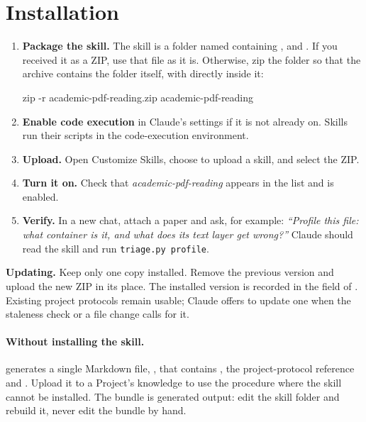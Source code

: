 \documentclass[11pt,a4paper]{article}
\newcommand\step[1]{\textsf{\textbf{#1}}}
\begin{document}
\section{Installation}\label{sec:install}

\begin{enumerate}
\item \step{Package the skill.} The skill is a folder named 
  containing ,  and . If you received it as a
  ZIP, use that file as it is. Otherwise, zip the folder so that the archive contains the
  folder itself, with  directly inside it:
\begin{cmd}
zip -r academic-pdf-reading.zip academic-pdf-reading
\end{cmd}
\item \step{Enable code execution} in Claude's settings if it is not already on. Skills run
  their scripts in the code-execution environment.
\item \step{Upload.} Open \textsf{Customize \textrightarrow{} Skills}, choose to upload a
  skill, and select the ZIP.
\item \step{Turn it on.} Check that \emph{academic-pdf-reading} appears in the list and is
  enabled.
\item \step{Verify.} In a new chat, attach a paper and ask, for example: \emph{``Profile this
  file: what container is it, and what does its text layer get wrong?''} Claude should read the
  skill and run \texttt{triage.py profile}.
\end{enumerate}

\begin{note}
\textbf{Updating.} Keep only one copy installed. Remove the previous version and upload the
new ZIP in its place. The installed version is recorded in the  field
of . Existing project protocols remain usable; Claude offers to update one when
the staleness check or a file change calls for it.
\end{note}

\paragraph{Without installing the skill.}  generates a single
Markdown file, , that contains , the
project-protocol reference and . Upload it to a Project's knowledge to use the
procedure where the skill cannot be installed. The bundle is generated output: edit the skill
folder and rebuild it, never edit the bundle by hand.
\end{document}
